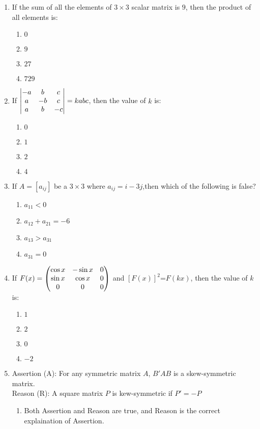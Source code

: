\begin{enumerate}
    \item If the sum of all the elements of $3 \times 3$ scalar matrix is $9$, then the product of all elements is:
	    \begin{enumerate}
		    \item $0$
		    \item $9$
		    \item $27$
		    \item $729$
	    \end{enumerate}
    \item If $ \begin{vmatrix}-a & b & c\\a & -b & c\\a & b & -c\end{vmatrix} = kabc$, then the value of $k$ is:
	    \begin{enumerate}
		    \item $0$
		    \item $1$
		    \item $2$
		    \item $4$
	    \end{enumerate}
    \item If $A=[a_{ij}]$ be a $3 \times 3$ where $a_{ij} = i - 3j$,then which of the following is false?
	    \begin{enumerate}
		    \item $a_{11}<0$
		    \item $a_{12} +a_{21} = -6$
		    \item $a_{13}>a_{31}$
		    \item $a_{31}=0$
	    \end{enumerate}
    \item If $F(x)= \begin{pmatrix}\cos x & -\sin x & 0\\ \sin x & \cos x & 0\\ 0 & 0 &0\end{pmatrix}$ and $[F(x)]^2$=$F(kx)$, then the value of $k$ is:
	    \begin{enumerate}
		    \item $1$
		    \item $2$
		    \item $0$
		    \item $-2$
	    \end{enumerate}
    \item Assertion (A): For any symmetric matrix $A$, $B'AB$ is a skew-symmetric matrix.\\
	  Reason (R): A square matrix $P$ is kew-symmetric if $P'=-P$
		\begin{enumerate}
			\item Both Assertion and Reason are true, and Reason is the correct explaination of Assertion.

\end{enumerate}
\end{enumerate}
